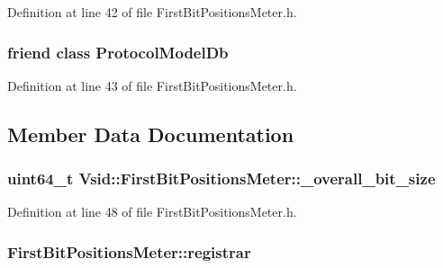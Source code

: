 Definition at line 42 of file First\-Bit\-Positions\-Meter.\-h.

\hypertarget{class_vsid_1_1_first_bit_positions_meter_a3c0d389e7a9476b06313d8fb9ca9fe68}{
\subsubsection[{Protocol\-Model\-Db}]{\setlength{\rightskip}{0pt plus 5cm}friend class {\bf Protocol\-Model\-Db}\hspace{0.3cm}{\ttfamily [friend]}}}\label{class_vsid_1_1_first_bit_positions_meter_a3c0d389e7a9476b06313d8fb9ca9fe68}


Definition at line 43 of file First\-Bit\-Positions\-Meter.\-h.



\subsection{Member Data Documentation}
\hypertarget{class_vsid_1_1_first_bit_positions_meter_a2557a44d6bf953c4f352f1e465fb1f43}{
\subsubsection[{\-\_\-overall\-\_\-bit\-\_\-size}]{\setlength{\rightskip}{0pt plus 5cm}uint64\-\_\-t Vsid\-::\-First\-Bit\-Positions\-Meter\-::\-\_\-overall\-\_\-bit\-\_\-size\hspace{0.3cm}{\ttfamily [protected]}}}\label{class_vsid_1_1_first_bit_positions_meter_a2557a44d6bf953c4f352f1e465fb1f43}


Definition at line 48 of file First\-Bit\-Positions\-Meter.\-h.

\hypertarget{class_vsid_1_1_first_bit_positions_meter_ae142f3b7fd6c6d24baf34114f04520a7}{
\subsubsection[{registrar}]{ First\-Bit\-Positions\-Meter\-::registrar\hspace{0.3cm}{\ttfamily [static]}}}\label{class_vsid_1_1_first_bit_positions_meter_ae142f3b7fd6c6d24baf34114f04520a7}


